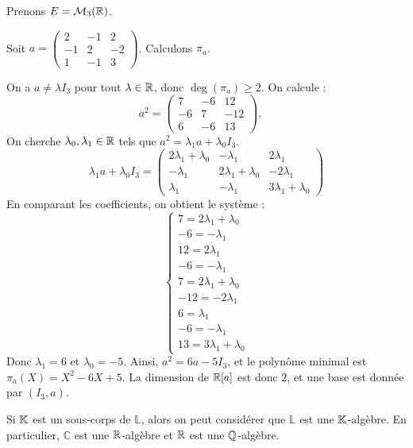 \documentclass[11pt,a4paper]{report}
\begin{document}
\begin{example}
    Prenons $E = \mathcal M_3(\mathbb{R})$.

    Soit $a = \left(\begin{matrix} 2 & -1 & 2 \\ -1 & 2 & -2 \\ 1 & -1 & 3 \end{matrix}\right)$. Calculons $\pi_a$.

    On a $a \ne \lambda I_3$ pour tout $\lambda \in \mathbb{R}$, donc $\deg(\pi_a) \ge 2$. On calcule :
    \[
        a^2 = \begin{pmatrix} 7 & -6 & 12 \\ -6 & 7 & -12 \\ 6 & -6 & 13 \end{pmatrix}, \quad
    \]
    On cherche $\lambda_0, \lambda_1 \in \mathbb{R}$ tels que $a^2 = \lambda_1 a + \lambda_0 I_3$.
    $$
        \lambda_1 a + \lambda_0 I_3 = \begin{pmatrix} 2\lambda_1 + \lambda_0 & -\lambda_1 & 2\lambda_1 \\ -\lambda_1 & 2\lambda_1 + \lambda_0 & -2\lambda_1 \\ \lambda_1 & -\lambda_1 & 3\lambda_1 + \lambda_0 \end{pmatrix}
    $$
    En comparant les coefficients, on obtient le système :
    \[
        \begin{cases}
            7 = 2\lambda_1 + \lambda_0 \\
            -6 = -\lambda_1 \\
            12 = 2\lambda_1 \\
            -6 = -\lambda_1 \\
            7 = 2\lambda_1 + \lambda_0 \\
            -12 = -2\lambda_1 \\
            6 = \lambda_1 \\
            -6 = -\lambda_1 \\
            13 = 3\lambda_1 + \lambda_0
        \end{cases}
    \]
    Donc $\lambda_1 = 6$ et $\lambda_0 = -5$. Ainsi, $a^2 = 6a - 5I_3$, et le polynôme minimal est $\pi_a(X) = X^2 - 6X + 5$. La dimension de $\mathbb{R}[a]$ est donc $2$, et une base est donnée par $(I_3, a)$.   
\end{example}

\begin{remark}
    Si $\mathbb{K}$ est un sous-corps de $\mathbb L$, alors on peut considérer que $\mathbb L$ est une $\mathbb{K}$-algèbre. En particulier, $\mathbb C$ est une $\mathbb{R}$-algèbre et $\mathbb{R}$ est une $\mathbb{Q}$-algèbre.
\end{remark}
\end{document}
